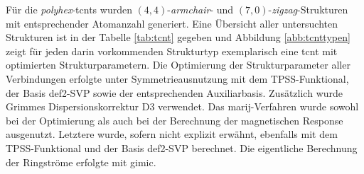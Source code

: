 Für die \textit{polyhex}-\acp{tcnt} wurden $(4,4)$-\textit{armchair}- und $(7,0)$-\textit{zigzag}-Strukturen mit entsprechender Atomanzahl generiert. Eine Übersicht aller untersuchten Strukturen ist in der Tabelle \ref{tab:tcnt} gegeben und Abbildung \ref{abb:tcnttypen} zeigt für jeden darin vorkommenden Strukturtyp exemplarisch eine \ac{tcnt} mit optimierten Strukturparametern. Die Optimierung der Strukturparameter aller Verbindungen erfolgte unter Symmetrieausnutzung mit dem TPSS-Funktional\supercite{tao2003climbing}, der Basis def2-SVP\supercite{weigend2005balanced} sowie der entsprechenden Auxiliarbasis\supercite{weigend2006accurate}. Zusätzlich wurde Grimmes Dispersionskorrektur D3\supercite{grimme2010consistent,grimme2011effect} verwendet. Das \ac{marij}-Verfahren wurde sowohl bei der Optimierung\supercite{sierka2003fast} als auch bei der Berechnung der magnetischen Response\supercite{reiter2017calculation} ausgenutzt. Letztere wurde, sofern nicht explizit erwähnt, ebenfalls mit dem TPSS-Funktional und der Basis def2-SVP berechnet. Die eigentliche Berechnung der Ringströme erfolgte mit \ac{gimic}\supercite{juselius2004calculation,taubert2011calculation,fliegl2011gauge,sundholm2016calculations}.

